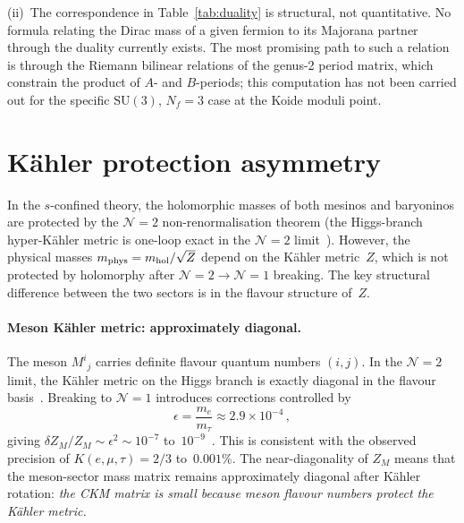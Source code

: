\documentclass[aps,prd,twocolumn,showpacs,preprintnumbers,superscriptaddress,floatfix]{revtex4-2}
\newcommand{\SU}{\mathrm{SU}}
\newcommand{\Nf}{N_{\!f}}
\begin{document}
(ii)~The correspondence in Table~\ref{tab:duality} is structural,
not quantitative.
No formula relating the Dirac mass of a given fermion to its
Majorana partner through the duality currently exists.
The most promising path to such a relation is through the Riemann
bilinear relations of the genus-2 period matrix, which constrain
the product of $A$- and $B$-periods; this computation has not
been carried out for the specific $\SU(3)$, $\Nf = 3$ case at
the Koide moduli point.


\section{K\"ahler protection asymmetry}
\label{sec:kahler}

In the $s$-confined theory, the holomorphic masses of both mesinos
and baryoninos are protected by the
$\mathcal{N}{=}2$ non-renormalisation theorem (the Higgs-branch
hyper-K\"ahler metric is one-loop exact in the $\mathcal{N}{=}2$
limit~\cite{SeibergWitten:1994}).
However, the physical masses
$m_{\rm phys} = m_{\rm hol}/\sqrt{Z}$ depend on the K\"ahler
metric~$Z$, which is not protected by holomorphy after
$\mathcal{N}{=}2 \to \mathcal{N}{=}1$ breaking.
The key structural difference between the two sectors is in the
flavour structure of~$Z$.

\paragraph{Meson K\"ahler metric: approximately diagonal.}
The meson $M^i{}_j$ carries definite flavour quantum numbers
$(i, j)$.
In the $\mathcal{N}{=}2$ limit, the K\"ahler metric on the Higgs
branch is exactly diagonal in the flavour
basis~\cite{SeibergWitten:1994}.
Breaking to $\mathcal{N}{=}1$ introduces corrections controlled by
\begin{equation}
  \epsilon = \frac{m_e}{m_\tau} \approx 2.9 \times 10^{-4}\,,
  \label{eq:epsilon}
\end{equation}
giving $\delta Z_M / Z_M \sim \epsilon^2 \sim 10^{-7}$
to~$10^{-9}$~\cite{Rivero:2024epjc}.
This is consistent with the observed precision of
$K(e,\mu,\tau) = 2/3$ to~$0.001\%$.
The near-diagonality of $Z_M$ means that the meson-sector mass
matrix remains approximately diagonal after K\"ahler rotation:
\emph{the CKM matrix is small because meson flavour numbers
protect the K\"ahler metric.}
\end{document}
